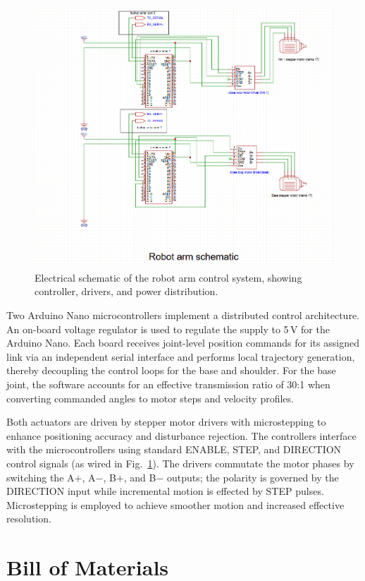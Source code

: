 \begin{figure}[H]
\centering
\includegraphics[width=0.95\linewidth]{pictures/arm_schamatic.png}
\caption{Electrical schematic of the robot arm control system, showing controller, drivers, and power distribution.}
\label{fig:arm_schematic}
\end{figure}

Two Arduino Nano microcontrollers implement a distributed control architecture. An on-board voltage regulator is used to regulate the supply to 
5\,V for the Arduino Nano. Each board receives joint-level position commands for its
assigned link via an independent serial interface and performs local trajectory generation, thereby decoupling the control loops for the base 
and shoulder. For the base joint, the software accounts for an effective transmission ratio of 30:1 when converting commanded angles to motor 
steps and velocity profiles.

Both actuators are driven by stepper motor drivers with microstepping to enhance positioning accuracy and disturbance rejection. The controllers 
interface with the microcontrollers using standard ENABLE, STEP, and DIRECTION control signals (as wired in Fig.~\ref{fig:arm_schematic}). The 
drivers commutate the motor phases by switching the A$+$, A$-$, B$+$, and B$-$ outputs; the polarity is governed by the DIRECTION input while 
incremental motion is effected by STEP pulses. Microstepping is employed to achieve smoother motion and increased effective resolution.


\section{Bill of Materials}

